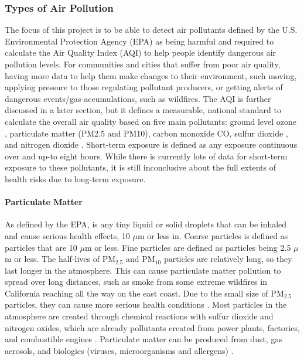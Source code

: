 \subsubsection{Types of Air Pollution}
The focus of this project is to be able to detect air pollutants defined by the
U.S.  Environmental Protection Agency (EPA) as being harmful and required to
calculate the Air Quality Index (AQI) to help people identify dangerous air
pollution levels. For communities and cities that suffer from poor air quality,
having more data to help them make changes to their environment, such moving, 
applying pressure to those regulating pollutant producers, or getting alerts of
dangerous events/gas-accumulations, such as wildfires. The AQI is further
discussed in a later section, but it defines a measurable, national standard to
calculate the overall air quality based on five main pollutants: ground level
ozone \ozone, particulate matter (PM2.5 and PM10), carbon monoxide CO, sulfur
dioxide \sdo, and nitrogen dioxide \ndo \cite{technical-aqi}. Short-term
exposure is defined as any exposure continuous over and up-to eight hours. While
there is currently lots of data for short-term exposure to these pollutants, it
is still inconclusive about the full extents of health risks due to long-term
exposure.

\paragraph{Particulate Matter} As defined by the EPA, is
any tiny liquid or solid droplets that can be inhaled and cause serious health
effects, 10 $\mu$m or less in. Coarse particles is defined as particles that are
10 $\mu$m or less. Fine particles are defined as particles being 2.5 $\mu$m or
less. The half-lives of PM$_{2.5}$ and PM$_{10}$ particles are relatively long,
so they last longer in the atmosphere. This can cause particulate matter
pollution to spread over long distances, such as smoke from some extreme
wildfires in California reaching all the way on the east coast. Due to the small
size of PM$_{2.5}$ particles, they can cause more serious health conditions
\cite{health-impacts-air-pollution-review}. Most particles in the atmosphere
are created through chemical reactions with sulfur dioxide and nitrogen oxides,
which are already pollutants created from power plants, factories, and
combustible engines \cite{epa-what-is-pm}.  Particulate matter can be produced
from dust, gas aerosols, and biologics (viruses, microorganisms and allergens)
\cite{health-impacts-air-pollution-review}.

